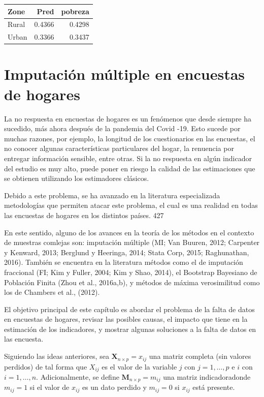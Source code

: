 \documentclass[
  spanish,
  12pt,
]{book}
\begin{document}
\begin{tabular}{l|r|r}
\hline
Zone & Pred & pobreza\\
\hline
Rural & 0.4366 & 0.4298\\
\hline
Urban & 0.3366 & 0.3437\\
\hline
\end{tabular}

\chapter{Imputación múltiple en encuestas de hogares}\label{imputaciuxf3n-muxfaltiple-en-encuestas-de-hogares}

La no respuesta en encuestas de hogares es un fenómenos que desde siempre ha sucedido, más ahora después de la pandemia del Covid -19. Esto sucede por muchas razones, por ejemplo, la longitud de los cuestionarios en las encuestas, el no conocer algunas características particulares del hogar, la renuencia por entregar información sensible, entre otras. Si la no respuesta en algún indicador del estudio es muy alto, puede poner en riesgo la calidad de las estimaciones que se obtienen utilizando los estimadores clásicos.

Debido a este problema, se ha avanzado en la literatura especializada metodologías que permiten atacar este problema, el cual es una realidad en todas las encuestas de hogares en los distintos países. 427

En este sentido, alguno de los avances en la teoría de los métodos en el contexto de muestras comlejas son: imputación múltiple (MI; Van Buuren, 2012; Carpenter y Kenward, 2013; Berglund y Heeringa, 2014; Stata Corp, 2015; Raghunathan, 2016). También se encuentra en la literatura métodos como el de imputación fraccional (FI; Kim y Fuller, 2004; Kim y Shao, 2014), el Bootstrap Bayesiano de Población Finita (Zhou et al., 2016a,b), y métodos de máxima verosimilitud como los de Chambers et al., (2012).

El objetivo principal de este capítulo es abordar el problema de la falta de datos en encuestas de hogares, revisar las posibles causas, el impacto que tiene en la estimación de los indicadores, y mostrar algunas soluciones a la falta de datos en las encuesta.

Siguiendo las ideas anteriores, sea \(\boldsymbol{X}_{n \times p} = x_{ij}\) una matriz completa (sin valores perdidos) de tal forma que \(X_{ij}\) es el valor de la variable \(j\) con \(j=1, \dots, p\) e \(i\) con \(i=1, \dots, n\). Adicionalmente, se define \(\boldsymbol{M}_{n \times p} = m_{ij}\) una matriz indicadoradonde \(m_{ij} = 1\) si el valor de \(x_{ij}\) es un dato perdido y \(m_{ij}=0\) si \(x_{ij}\) está presente.
\end{document}
